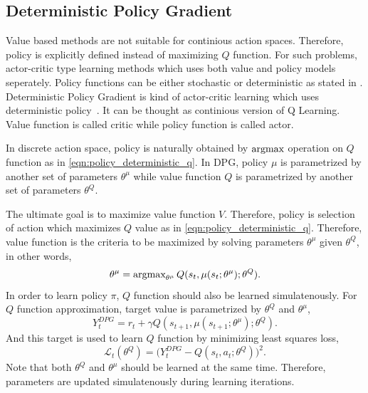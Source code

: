 \subsection{Deterministic Policy Gradient}

Value based methods are not suitable for continious action spaces. 
Therefore, policy is explicitly defined instead of maximizing $Q$ function. 
For such problems, actor-critic type learning methods which uses both value and policy models seperately. 
Policy functions can be either stochastic or deterministic as stated in .  
Deterministic Policy Gradient is kind of actor-critic learning which uses deterministic policy~\cite{silver_deterministic_2014}. 
It can be thought as continious version of Q Learning. 
Value function is called critic while policy function is called actor. 

In discrete action space, policy is naturally obtained by $\operatorname{\textup{argmax}}$ operation on $Q$ function as in \eqref{eqn:policy_deterministic_q}. 
In DPG, policy $\mu$ is parametrized by another set of parameters $\theta^\mu$ while value function $Q$ is parametrized by another set of parameters $\theta^Q$. 

The ultimate goal is to maximize value function $V$. Therefore, policy is selection of action which maximizes $Q$ value as in \eqref{eqn:policy_deterministic_q}. 
Therefore, value function is the criteria to be maximized by solving parameters $\theta^\mu$ given $\theta^Q$, in other words, 
\begin{equation}
\label{eqn:dpg_value_maximization}
\theta^\mu = \operatorname{\textup{argmax}}_{\theta^\mu} Q(s_t, \mu(s_t;\theta^\mu);\theta^Q).
\end{equation}
In order to learn policy $\pi$, $Q$ function should also be learned simulatenously. 
For $Q$ function approximation, target value is parametrized by $\theta^Q$ and $\theta^\mu$,
\begin{equation}
\label{eqn:dpg_target}
Y_t^{DPG} = r_t + \gamma Q(s_{t+1}, \mu(s_{t+1};\theta^\mu);\theta^Q).
\end{equation}
And this target is used to learn $Q$ function by minimizing least squares loss,
\begin{equation}
\label{eqn:dpq_loss}
\mathcal{L}_t(\theta^Q) = \big( Y_t^{DPG} - Q(s_t,a_t;\theta^Q) \big) ^ 2.
\end{equation}
Note that both $\theta^Q$ and $\theta^\mu$ should be learned at the same time. Therefore, parameters are updated simulatenously during learning iterations. 

